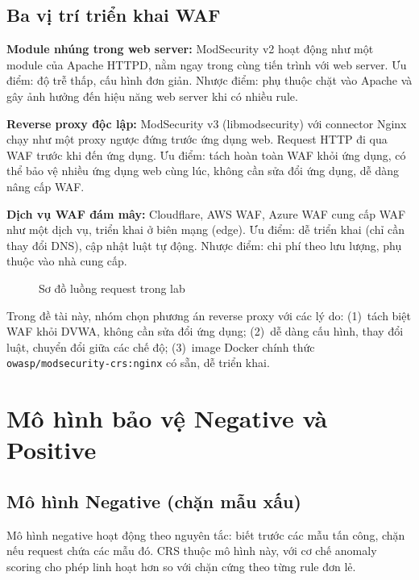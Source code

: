 \documentclass[12pt,a4paper,twoside]{report}
\begin{document}
\subsection{Ba vị trí triển khai WAF}

\textbf{Module nhúng trong web server:} ModSecurity v2 hoạt động như một module của Apache HTTPD, nằm ngay trong cùng tiến trình với web server. Ưu điểm: độ trễ thấp, cấu hình đơn giản. Nhược điểm: phụ thuộc chặt vào Apache và gây ảnh hưởng đến hiệu năng web server khi có nhiều rule.

\textbf{Reverse proxy độc lập:} ModSecurity v3 (libmodsecurity) với connector Nginx chạy như một proxy ngược đứng trước ứng dụng web. Request HTTP đi qua WAF trước khi đến ứng dụng. Ưu điểm: tách hoàn toàn WAF khỏi ứng dụng, có thể bảo vệ nhiều ứng dụng web cùng lúc, không cần sửa đổi ứng dụng, dễ dàng nâng cấp WAF.

\textbf{Dịch vụ WAF đám mây:} Cloudflare, AWS WAF, Azure WAF cung cấp WAF như một dịch vụ, triển khai ở biên mạng (edge). Ưu điểm: dễ triển khai (chỉ cần thay đổi DNS), cập nhật luật tự động. Nhược điểm: chi phí theo lưu lượng, phụ thuộc vào nhà cung cấp.

\begin{figure}[H]
\centering
{}
\caption{Sơ đồ luồng request trong lab}
\label{fig:flow}
\end{figure}

Trong đề tài này, nhóm chọn phương án reverse proxy với các lý do: (1)~tách biệt WAF khỏi DVWA, không cần sửa đổi ứng dụng; (2)~dễ dàng cấu hình, thay đổi luật, chuyển đổi giữa các chế độ; (3)~image Docker chính thức \texttt{owasp/modsecurity-crs:nginx} có sẵn, dễ triển khai.

\section{Mô hình bảo vệ Negative và Positive}

\subsection{Mô hình Negative (chặn mẫu xấu)}

Mô hình negative hoạt động theo nguyên tắc: biết trước các mẫu tấn công, chặn nếu request chứa các mẫu đó. CRS thuộc mô hình này, với cơ chế anomaly scoring cho phép linh hoạt hơn so với chặn cứng theo từng rule đơn lẻ.
\end{document}
